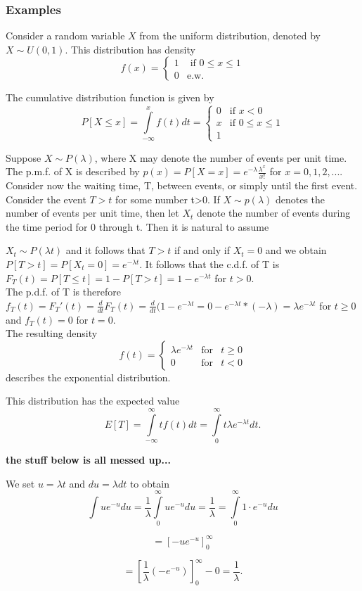 \documentclass[12pt,a4paper]{article}
\theoremstyle{regla}
\theoremstyle{remark}
\theoremstyle{definition}
\theoremstyle{nonumberbreak}
\begin{document}
\subsubsection{Examples}
\begin{xmpl}
Consider a random variable $X$ from the uniform distribution, denoted by $X\sim U(0,1)$.  This distribution has density
$$
f(x) = \left \{ \begin{array}{rl}
1 &\mbox { if $0 \leq x \leq 1$} \\
0 &\mbox {e.w.}
\end{array} \right.
$$

The cumulative distribution function is given by
$$
P[X\leq x] = \int\limits^{x}_{-\infty} f(t)dt = \left\{ \begin{array}{rl}
0 &\mbox {if $x<0$}\\
x &\mbox {if $0 \leq x \leq 1$} \\
1
\end{array} \right.
$$
\end{xmpl}
\begin{xmpl}
Suppose $X \sim P(\lambda)$, where X may denote the number of events per unit time. The p.m.f. of X is described by $p(x)=P[X=x]=e^{-\lambda}\frac{\lambda^x}{x!}$ for $x=0,1,2,...$. Consider now the waiting time, T, between events, or simply until the first event. Consider the event $T>t$ for some number t>0. If $X\sim p(\lambda)$ denotes the number of events per unit time, then let $X_t$ denote the number of events during the time period for 0 through t. Then it is natural to assume

$X_t \sim P(\lambda t)$ and it follows that $T>t$ if and only if $X_t=0$ and we obtain $P[T>t]=P[X_t=0]=e^{-\lambda t}$.
It follows that the c.d.f. of T is $F_T(t)=P[T\leq t]=1-P[T>t]=1-e^{-\lambda t}$ for $t>0$.\\

The p.d.f. of T is therefore $f_T(t)=F_T'(t)=\frac{d}{dt}F_T(t)=\frac{d}{dt}(1-e^{-\lambda t}=0-e^{- \lambda t}*(-\lambda)=\lambda e^{-\lambda t}$ for $t \geq 0$ and $f_T(t)=0$ for $t=0$. \\

The resulting density 
$$f(t) = \left\{ \begin{array}{rcl}
\lambda e^{-\lambda t} & \mbox{for}& t \geq0\\
0& \mbox{for} & t<0
\end{array}\right.$$
describes the exponential distribution.

This distribution has the expected value
$$E[T]=\int\limits^{\infty}_{-\infty} tf(t)dt=\int\limits^{\infty}_{0} t \lambda e^{-\lambda t}dt.$$

\textbf{the stuff below is all messed up...}

We set $u=\lambda t$ and $du=\lambda dt$ to obtain
$$\int ue^{-u}du= \frac{1}{\lambda}\int\limits^{\infty}_{0} ue^{-u}du=\frac{1}{\lambda}=
\int\limits^{\infty}_{0} 1 \cdot e^{-u}du$$

$$=\left [ -ue^{-u}\right ] _0^{\infty}$$

$$=\left[\frac{1}{\lambda}(-e^{-u})\right]_{0}^{\infty} -0=\frac{1}{\lambda} .$$
\end {xmpl}
\end{document}
